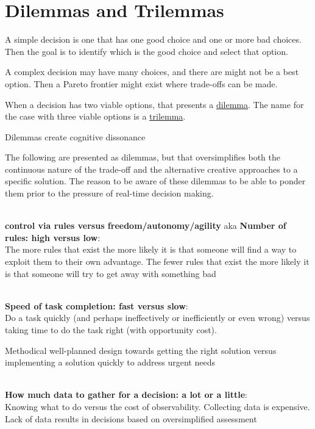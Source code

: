 \section{Dilemmas and Trilemmas\label{sec:dilemma_trilemma}}

A simple decision is one that has one good choice and one or more bad choices. Then the goal is to identify which is the good choice and select that option.

A complex decision may have many choices, and there are might not be a best option. Then a Pareto frontier might exist where trade-offs can be made. 

When a decision has two viable options, that presents a \href{https://en.wikipedia.org/wiki/Dilemma}{dilemma}. The name for the case with three viable options is a \href{https://en.wikipedia.org/wiki/Trilemma}{trilemma}.

Dilemmas create cognitive dissonance

The following are presented as dilemmas, but that oversimplifies both the continuous nature of the trade-off and the alternative creative approaches to a specific solution. The reason to be aware of these dilemmas to be able to ponder them prior to the pressure of real-time decision making. 

\ \\


\textbf{control via rules versus freedom/autonomy/agility} aka
\textbf{Number of rules: high versus low}:\\
The more rules that exist the more likely it is that someone will find a way to exploit them to their own advantage.
The fewer rules that exist the more likely it is that someone will try to get away with something bad


\ \\

\textbf{Speed of task completion: fast versus slow}:\\
Do a task quickly (and perhaps ineffectively or inefficiently or even wrong) versus taking time to do the task right (with opportunity cost).

Methodical well-planned design towards getting the right solution versus implementing a solution quickly to address urgent needs


\ \\

\textbf{How much data to gather for a decision: a lot or a little}:\\
Knowing what to do versus the cost of observability. Collecting data is expensive. Lack of data results in decisions based on oversimplified assessment

